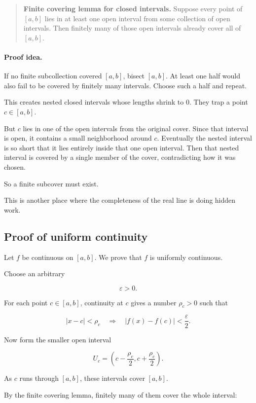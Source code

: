 \begin{quote}
\textbf{Finite covering lemma for closed intervals.}
Suppose every point of \([a,b]\) lies in at least one open interval from some collection
of open intervals.  Then finitely many of those open intervals already cover all of
\([a,b]\).
\end{quote}

\paragraph{Proof idea.}
If no finite subcollection covered \([a,b]\), bisect \([a,b]\).  At least one half would
also fail to be covered by finitely many intervals.  Choose such a half and repeat.

This creates nested closed intervals whose lengths shrink to \(0\).  They trap a point
\(c\in[a,b]\).

But \(c\) lies in one of the open intervals from the original cover.  Since that interval is
open, it contains a small neighborhood around \(c\).  Eventually the nested interval is
so short that it lies entirely inside that one open interval.  Then that nested interval is
covered by a single member of the cover, contradicting how it was chosen.

So a finite subcover must exist.

This is another place where the completeness of the real line is doing hidden work.

\subsection{Proof of uniform continuity}
\label{appsubsec:uniform-continuity-proof}

Let \(f\) be continuous on \([a,b]\).  We prove that \(f\) is uniformly continuous.

Choose an arbitrary

\[
\varepsilon>0.
\]

For each point \(c\in[a,b]\), continuity at \(c\) gives a number \(\rho_c>0\) such that

\[
|x-c|<\rho_c
\quad\Longrightarrow\quad
|f(x)-f(c)|<\frac{\varepsilon}{2}.
\]

Now form the smaller open interval

\[
U_c=\left(c-\frac{\rho_c}{2},c+\frac{\rho_c}{2}\right).
\]

As \(c\) runs through \([a,b]\), these intervals cover \([a,b]\).

By the finite covering lemma, finitely many of them cover the whole interval:

